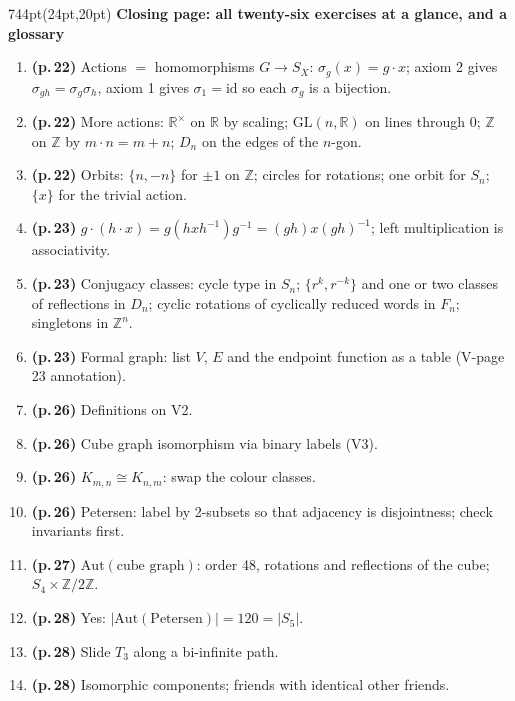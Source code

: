 \documentclass[10pt]{article}
\newcommand{\Z}{\mathbb{Z}}
\newcommand{\R}{\mathbb{R}}
\newcommand{\GL}{\mathrm{GL}}
\newcommand{\inv}{^{-1}}
\begin{document}
\begin{textblock*}{744pt}(24pt,20pt)
{\sffamily\bfseries\large\color{big} Closing page: all twenty-six exercises at a glance, and a glossary}\par\vspace{5pt}
\begin{minipage}[t]{400pt}
\scriptsize
\begin{enumerate}[leftmargin=*,itemsep=1pt]
\item \textbf{(p.\,22)} Actions $=$ homomorphisms $G\to S_X$: $\sigma_g(x)=g\cdot x$; axiom 2 gives $\sigma_{gh}=\sigma_g\sigma_h$, axiom 1 gives $\sigma_1=\mathrm{id}$ so each $\sigma_g$ is a bijection.
\item \textbf{(p.\,22)} More actions: $\R^\times$ on $\R$ by scaling; $\GL(n,\R)$ on lines through $0$; $\Z$ on $\Z$ by $m\cdot n=m+n$; $D_n$ on the edges of the $n$-gon.
\item \textbf{(p.\,22)} Orbits: $\{n,-n\}$ for $\pm1$ on $\Z$; circles for rotations; one orbit for $S_n$; $\{x\}$ for the trivial action.
\item \textbf{(p.\,23)} $g\cdot(h\cdot x)=g(hxh\inv)g\inv=(gh)x(gh)\inv$; left multiplication is associativity.
\item \textbf{(p.\,23)} Conjugacy classes: cycle type in $S_n$; $\{r^k,r^{-k}\}$ and one or two classes of reflections in $D_n$; cyclic rotations of cyclically reduced words in $F_n$; singletons in $\Z^n$.
\item \textbf{(p.\,23)} Formal graph: list $V$, $E$ and the endpoint function as a table (V-page 23 annotation).
\item \textbf{(p.\,26)} Definitions on V2.
\item \textbf{(p.\,26)} Cube graph isomorphism via binary labels (V3).
\item \textbf{(p.\,26)} $K_{m,n}\cong K_{n,m}$: swap the colour classes.
\item \textbf{(p.\,26)} Petersen: label by 2-subsets so that adjacency is disjointness; check invariants first.
\item \textbf{(p.\,27)} $\mathrm{Aut}(\text{cube graph})$: order 48, rotations and reflections of the cube; $S_4\times\Z/2\Z$.
\item \textbf{(p.\,28)} Yes: $|\mathrm{Aut}(\text{Petersen})|=120=|S_5|$.
\item \textbf{(p.\,28)} Slide $T_3$ along a bi-infinite path.
\item \textbf{(p.\,28)} Isomorphic components; friends with identical other friends.

\end{enumerate}
\end{minipage}
\end{textblock*}
\end{document}
